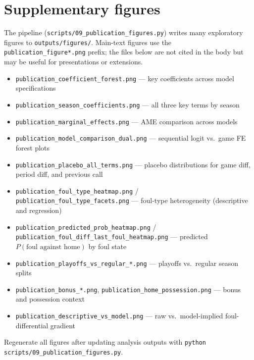 \label{app:supplementary_figures}
\section{Supplementary figures}
\label{app:supplementary_figures:detail}

The pipeline (\texttt{scripts/09\_publication\_figures.py}) writes many exploratory figures to \texttt{outputs/figures/}. Main-text figures use the \texttt{publication\_figure*.png} prefix; the files below are not cited in the body but may be useful for presentations or extensions.

\begin{itemize}
  \item \texttt{publication\_coefficient\_forest.png} --- key coefficients across model specifications
  \item \texttt{publication\_season\_coefficients.png} --- all three key terms by season
  \item \texttt{publication\_marginal\_effects.png} --- AME comparison across models
  \item \texttt{publication\_model\_comparison\_dual.png} --- sequential logit vs.\ game FE forest plots
  \item \texttt{publication\_placebo\_all\_terms.png} --- placebo distributions for game diff, period diff, and previous call
  \item \texttt{publication\_foul\_type\_heatmap.png} / \texttt{publication\_foul\_type\_facets.png} --- foul-type heterogeneity (descriptive and regression)
  \item \texttt{publication\_predicted\_prob\_heatmap.png} / \texttt{publication\_foul\_diff\_last\_foul\_heatmap.png} --- predicted $P(\text{foul against home})$ by foul state
  \item \texttt{publication\_playoffs\_vs\_regular\_*.png} --- playoffs vs.\ regular season splits
  \item \texttt{publication\_bonus\_*.png}, \texttt{publication\_home\_possession.png} --- bonus and possession context
  \item \texttt{publication\_descriptive\_vs\_model.png} --- raw vs.\ model-implied foul-differential gradient
\end{itemize}

Regenerate all figures after updating analysis outputs with \texttt{python scripts/09\_publication\_figures.py}.
